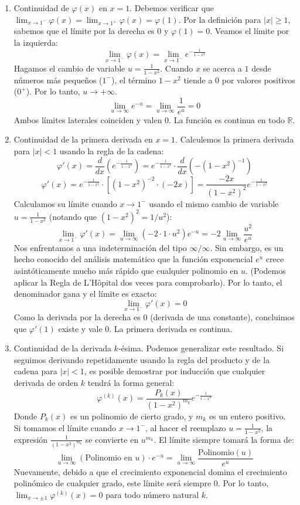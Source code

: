 \documentclass[11pt,spanish]{article}
\begin{document}
\begin{enumerate}
\item Continuidad de $\varphi(x)$ en $x = 1$.
Debemos verificar que $\lim_{x \to 1^-} \varphi(x) = \lim_{x \to 1^+} \varphi(x) = \varphi(1)$.
Por la definición para $|x|\ge 1$, sabemos que el límite por la derecha es $0$ y $\varphi(1) = 0$.
Veamos el límite por la izquierda:
$$\lim_{x \to 1^-} \varphi(x) = \lim_{x \to 1^-} e^{-\frac{1}{1-x^2}}$$
Hagamos el cambio de variable $u = \frac{1}{1-x^2}$. Cuando $x$ se acerca a $1$ desde números más pequeños ($1^-$), el término $1-x^2$ tiende a $0$ por valores positivos ($0^+$). Por lo tanto, $u \to +\infty$.
$$\lim_{u \to \infty} e^{-u} = \lim_{u \to \infty} \frac{1}{e^u} = 0$$
Ambos límites laterales coinciden y valen $0$. La función es continua en todo $\mathbb{R}$.

\item Continuidad de la primera derivada en $x = 1$.
Calculemos la primera derivada para $|x| < 1$ usando la regla de la cadena:
$$\varphi'(x) = \frac{d}{dx} \left( e^{-\frac{1}{1-x^2}} \right) = e^{-\frac{1}{1-x^2}} \cdot \frac{d}{dx} \left( -(1-x^2)^{-1} \right)$$
$$\varphi'(x) = e^{-\frac{1}{1-x^2}} \cdot \left[ (1-x^2)^{-2} \cdot (-2x) \right] = \frac{-2x}{(1-x^2)^2} e^{-\frac{1}{1-x^2}}$$
Calculamos su límite cuando $x \to 1^-$ usando el mismo cambio de variable $u = \frac{1}{1-x^2}$ (notando que $(1-x^2)^2 = 1/u^2$):
$$\lim_{x \to 1^-} \varphi'(x) = \lim_{u \to \infty} (-2 \cdot 1 \cdot u^2) e^{-u} = -2 \lim_{u \to \infty} \frac{u^2}{e^u}$$
Nos enfrentamos a una indeterminación del tipo $\infty / \infty$. Sin embargo, es un hecho conocido del análisis matemático que la función exponencial $e^u$ crece asintóticamente mucho más rápido que cualquier polinomio en $u$. (Podemos aplicar la Regla de L'Hôpital dos veces para comprobarlo). Por lo tanto, el denominador gana y el límite es exacto:
$$\lim_{x \to 1^-} \varphi'(x) = 0$$
Como la derivada por la derecha es $0$ (derivada de una constante), concluimos que $\varphi'(1)$ existe y vale $0$. La primera derivada es continua.

\item Continuidad de la derivada $k$-ésima.
Podemos generalizar este resultado. Si seguimos derivando repetidamente usando la regla del producto y de la cadena para $|x| < 1$, es posible demostrar por inducción que cualquier derivada de orden $k$ tendrá la forma general:
$$\varphi^{(k)}(x) = \frac{P_k(x)}{(1-x^2)^{m_k}} e^{-\frac{1}{1-x^2}}$$
Donde $P_k(x)$ es un polinomio de cierto grado, y $m_k$ es un entero positivo.
Si tomamos el límite cuando $x \to 1^-$, al hacer el reemplazo $u = \frac{1}{1-x^2}$, la expresión $\frac{1}{(1-x^2)^{m_k}}$ se convierte en $u^{m_k}$. El límite siempre tomará la forma de:
$$\lim_{u \to \infty} (\text{Polinomio en } u) \cdot e^{-u} = \lim_{u \to \infty} \frac{\text{Polinomio}(u)}{e^u}$$
Nuevamente, debido a que el crecimiento exponencial domina el crecimiento polinómico de cualquier grado, este límite será siempre $0$.
Por lo tanto, $\lim_{x \to \pm 1} \varphi^{(k)}(x) = 0$ para todo número natural $k$. 


\end{enumerate}
\end{document}
